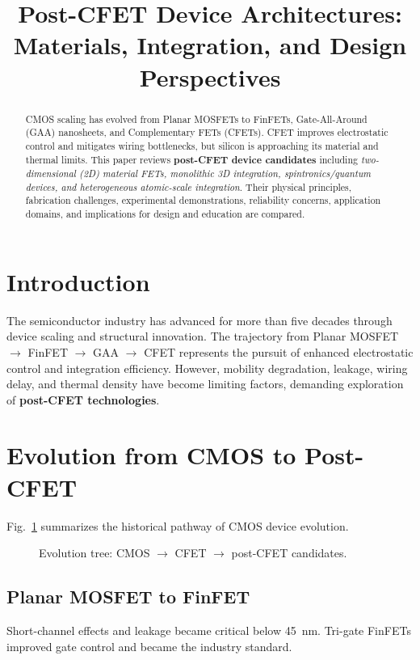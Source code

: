 \documentclass[conference]{IEEEtran}
\title{Post-CFET Device Architectures: Materials, Integration, and Design Perspectives}
\author{
\IEEEauthorblockN{Shinichi Samizo}
\IEEEauthorblockA{Independent Semiconductor Researcher\\
Project Design Hub, Samizo-AITL\\
\textit{Email:} \href{mailto:shin3t72@gmail.com}{shin3t72@gmail.com}\quad
\textit{GitHub:} \href{https://github.com/Samizo-AITL}{Samizo-AITL}}
}
\newcommand{\tikzcol}[2][\linewidth]{\resizebox{#1}{!}{}}
\begin{document}
\maketitle

\begin{abstract}
CMOS scaling has evolved from Planar MOSFETs to FinFETs, Gate-All-Around (GAA) nanosheets, and Complementary FETs (CFETs). CFET improves electrostatic control and mitigates wiring bottlenecks, but silicon is approaching its material and thermal limits. This paper reviews \textbf{post-CFET device candidates} including \textit{two-dimensional (2D) material FETs, monolithic 3D integration, spintronics/quantum devices, and heterogeneous atomic-scale integration}. Their physical principles, fabrication challenges, experimental demonstrations, reliability concerns, application domains, and implications for design and education are compared.
\end{abstract}

\section{Introduction}
The semiconductor industry has advanced for more than five decades through device scaling and structural innovation.
The trajectory from Planar MOSFET $\rightarrow$ FinFET $\rightarrow$ GAA $\rightarrow$ CFET represents the pursuit of enhanced electrostatic control and integration efficiency.
However, mobility degradation, leakage, wiring delay, and thermal density have become limiting factors, demanding exploration of \textbf{post-CFET technologies}.

\section{Evolution from CMOS to Post-CFET}
Fig.~\ref{fig:evolution} summarizes the historical pathway of CMOS device evolution.

\begin{figure}[t]
  \centering
  \tikzcol{\figures/evolution_tree.tex} %
  \caption{Evolution tree: CMOS $\rightarrow$ CFET $\rightarrow$ post-CFET candidates.}
  \label{fig:evolution}
\end{figure}

\subsection{Planar MOSFET to FinFET}
Short-channel effects and leakage became critical below \SI{45}{\nano\meter}. Tri-gate FinFETs improved gate control and became the industry standard.
\end{document}
